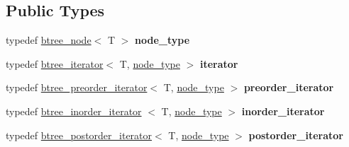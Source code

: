 \subsection*{\-Public \-Types}
\begin{DoxyCompactItemize}
\item 
\hypertarget{classtree_1_1cBinaryRep_a4218118406b4b792f771f2cffab1fe67}{typedef \hyperlink{structtree_1_1btree__node}{btree\-\_\-node}$<$ \-T $>$ {\bfseries node\-\_\-type}}\label{classtree_1_1cBinaryRep_a4218118406b4b792f771f2cffab1fe67}

\item 
\hypertarget{classtree_1_1cBinaryRep_af8646ca9dd6c8e2abc30f0a24eea2785}{typedef \hyperlink{classtree_1_1btree__iterator}{btree\-\_\-iterator}$<$ \-T, \*
\hyperlink{structtree_1_1btree__node}{node\-\_\-type} $>$ {\bfseries iterator}}\label{classtree_1_1cBinaryRep_af8646ca9dd6c8e2abc30f0a24eea2785}

\item 
\hypertarget{classtree_1_1cBinaryRep_a80d54fe0461119770e3be144672dcbc6}{typedef \*
\hyperlink{classtree_1_1btree__preorder__iterator}{btree\-\_\-preorder\-\_\-iterator}$<$ \-T, \*
\hyperlink{structtree_1_1btree__node}{node\-\_\-type} $>$ {\bfseries preorder\-\_\-iterator}}\label{classtree_1_1cBinaryRep_a80d54fe0461119770e3be144672dcbc6}

\item 
\hypertarget{classtree_1_1cBinaryRep_ad1bba7a7672ee7bdf7ef4979a1b00879}{typedef \hyperlink{classtree_1_1btree__inorder__iterator}{btree\-\_\-inorder\-\_\-iterator}\*
$<$ \-T, \hyperlink{structtree_1_1btree__node}{node\-\_\-type} $>$ {\bfseries inorder\-\_\-iterator}}\label{classtree_1_1cBinaryRep_ad1bba7a7672ee7bdf7ef4979a1b00879}

\item 
\hypertarget{classtree_1_1cBinaryRep_a7bef52fb6be8078a9d082c22f9054dd0}{typedef \*
\hyperlink{classtree_1_1btree__postorder__iterator}{btree\-\_\-postorder\-\_\-iterator}$<$ \-T, \*
\hyperlink{structtree_1_1btree__node}{node\-\_\-type} $>$ {\bfseries postorder\-\_\-iterator}}\label{classtree_1_1cBinaryRep_a7bef52fb6be8078a9d082c22f9054dd0}

\end{DoxyCompactItemize}
